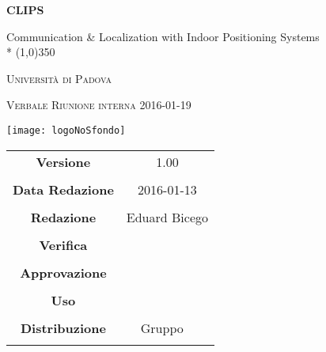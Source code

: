 \documentclass[a4paper,12pt]{article}
\author{Eduard Bicego}
\date{19/01/2016}
\begin{document}
\begin{titlepage}
	\centering
	{\huge\bfseries CLIPS\par}
	Communication \& Localization with Indoor Positioning Systems \\*
	\line(1,0){350} \\
	{\scshape\LARGE Università di Padova \par}
	\vspace{1cm}
	{\scshape\Large Verbale Riunione interna 2016-01-19\par}
	\vspace{2cm}
	
\begin{center}
	{\texttt{[image: logoNoSfondo]} \par}
	\end{center}
		
	\vfill \vfill
	\begin{tabular}{c|c}
		{\hfill \textbf{Versione}} 			& 1.00				\\ \\
		{\hfill\textbf{Data Redazione}} 	& 2016-01-13  		\\ \\
		{\hfill\textbf{Redazione}} 			& Eduard Bicego		\\ \\
		{\hfill\textbf{Verifica}} 			&  					\\ \\
		{\hfill\textbf{Approvazione}} 		&  					\\ \\
		{\hfill\textbf{Uso}} 				& 					\\ \\
		{\hfill\textbf{Distribuzione}} 		& Gruppo \leaf\		\\ \\
	\end{tabular}
\end{titlepage}
	
	\newpage

	
	\label{LastFrontPage}
	

	\newpage
	
	\pagestyle{mymain}
	
	
		

	
		
	
	\newpage
		
	
	\newpage
		
				
	\label{LastPage}
\end{document}
